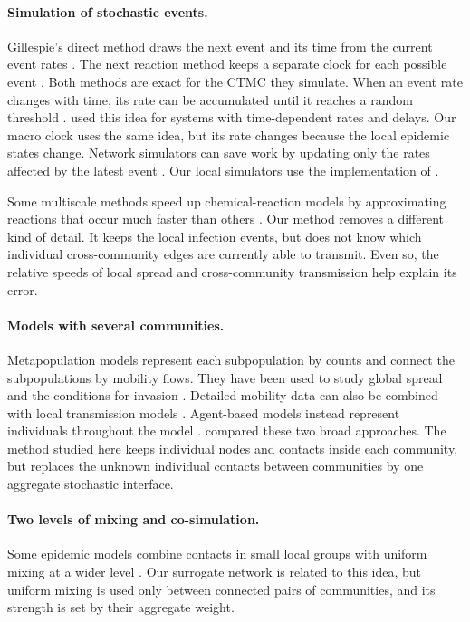 \documentclass[a4paper,fleqn]{cas-sc}
\begin{document}
\paragraph{Simulation of stochastic events.}
Gillespie's direct method draws the next event and its time from the current event rates \citep{gillespie1977exact}. The next reaction method keeps a separate clock for each possible event \citep{gibson2000}. Both methods are exact for the CTMC they simulate. When an event rate changes with time, its rate can be accumulated until it reaches a random threshold \citep{ethier1986}. \citet{anderson2007} used this idea for systems with time-dependent rates and delays. Our macro clock uses the same idea, but its rate changes because the local epidemic states change. Network simulators can save work by updating only the rates affected by the latest event \citep{vestergaard2015,kuryliak2025simulating}. Our local simulators use the implementation of \citet{kuryliak2025simulating}.

Some multiscale methods speed up chemical-reaction models by approximating reactions that occur much faster than others \citep{haseltine2002,cao2005slow}. Our method removes a different kind of detail. It keeps the local infection events, but does not know which individual cross-community edges are currently able to transmit. Even so, the relative speeds of local spread and cross-community transmission help explain its error.

\paragraph{Models with several communities.}
Metapopulation models represent each subpopulation by counts and connect the subpopulations by mobility flows. They have been used to study global spread and the conditions for invasion \citep{colizza2007reaction,colizza2008,balcan2009,balcan2010modeling}. Detailed mobility data can also be combined with local transmission models \citep{chang2021}. Agent-based models instead represent individuals throughout the model \citep{eubank2004,kerr2021}. \citet{ajelli2010} compared these two broad approaches. The method studied here keeps individual nodes and contacts inside each community, but replaces the unknown individual contacts between communities by one aggregate stochastic interface.

\paragraph{Two levels of mixing and co-simulation.}
Some epidemic models combine contacts in small local groups with uniform mixing at a wider level \citep{ball1997}. Our surrogate network is related to this idea, but uniform mixing is used only between connected pairs of communities, and its strength is set by their aggregate weight.
\end{document}
